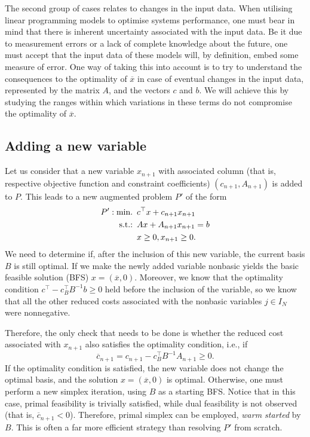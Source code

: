 The second group of cases relates to changes in the input data. When utilising linear programming models to optimise systems performance, one must bear in mind that there is inherent uncertainty associated with the input data. Be it due to measurement errors or a lack of complete knowledge about the future, one must accept that the input data of these models will, by definition, embed some measure of error. One way of taking this into account is to try to understand the consequences to the optimality of $\overline{x}$ in case of eventual changes in the input data, represented by the matrix $A$, and the vectors $c$ and $b$. We will achieve this by studying the ranges within which variations in these terms do not compromise the optimality of $\overline{x}$. 


\subsection{Adding a new variable} \label{section_611}

Let us consider that a new variable $x_{n+1}$ with associated column (that is, respective objective function and constraint coefficients) $(c_{n+1}, A_{n+1})$ is added to $P$. This leads to a new augmented problem $P'$ of the form
%
\begin{align*}
	P': \mathop{\text{min.~}} \, &c^\top x + c_{n+1}x_{n+1}\\
	\mathop{\text{s.t.:~}} \, & Ax + A_{n+1}x_{n+1}= b \\
	& x \geq 0, x_{n+1} \geq 0. 	
\end{align*}
%
We need to determine if, after the inclusion of this new variable, the current basis $B$ is still optimal. If we make the newly added variable nonbasic yields the basic feasible solution (BFS) $x = (\overline{x}, 0)$. Moreover, we know that the optimality condition $c^\top - c_B^\top B^{-1}b \geq 0$ held before the inclusion of the variable, so we know that all the other reduced costs associated with the nonbasic variables $j \in I_N$ were nonnegative. 

Therefore, the only check that needs to be done is whether the reduced cost associated with $x_{n+1}$ also satisfies the optimality condition, i.e., if
%
\begin{equation*}
	\overline{c}_{n+1} = c_{n+1} - c_B^\top B^{-1}A_{n+1} \geq 0.	
\end{equation*}
%
If the optimality condition is satisfied, the new variable does not change the optimal basis, and the solution $x = (\overline{x}, 0)$ is optimal. Otherwise, one must perform a new simplex iteration, using $B$ as a starting BFS. Notice that in this case, primal feasibility is trivially satisfied, while dual feasibility is not observed (that is, $\overline{c}_{n+1} < 0$). Therefore, primal simplex can be employed, \emph{warm started} by $B$. This is often a far more efficient strategy than resolving $P'$ from scratch.


